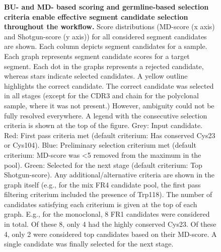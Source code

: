\begin{subappendices}
\begin{figure}[!ht]
    \caption{\textbf{BU- and MD- based scoring and germline-based selection criteria enable effective segment candidate selection throughout the workflow.} Score distributions (MD-score (x axis) and Shotgun-score (y axis)) for all considered segment candidates are shown. Each column depicts segment candidates for a sample. Each graph represents segment candidate scores for a target segment. Each dot in the graphs represents a rejected candidate, whereas stars indicate selected candidates. A yellow outline highlights the correct candidate. The correct candidate was selected in all stages (except for the CDR3 and chain for the polyclonal sample, where it was not present.) However, ambiguity could not be fully resolved everywhere. A legend with the consecutive selection criteria is shown at the top of the figure. Grey: Input candidate. Red: First pass criteria met (default criterium: Has conserved Cys23 or Cys104). Blue: Preliminary selection criterium met (default criterium: MD-score was <5 removed from the maximum in the pool). Green: Selected for the next stage (default criterium: Top Shotgun-score). Any additional/alternative criteria are shown in the graph itself (e.g., for the mix FR4 candidate pool, the first pass filtering criterium included the presence of Trp118). The number of candidates satisfying each criterium is given at the top of each graph. E.g., for the monoclonal, 8 FR1 candidates were considered in total. Of these 8, only 4 had the highly conserved Cys23. Of these 4, only 2 were considered top candidates based on their MD-score. A single candidate was finally selected for the next stage.}
    \vspace{24cm}
  \end{figure}




\end{subappendices}

